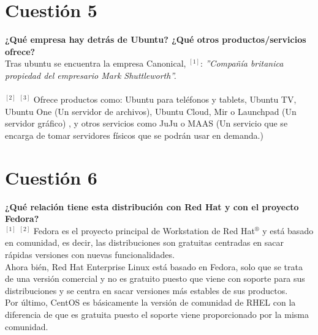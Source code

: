 \documentclass[a4paper, 11pt]{article} %
\begin{document}
\section{Cuestión 5}
\textbf{¿Qué empresa hay detrás de Ubuntu? ¿Qué otros productos/servicios ofrece?}\\ 
Tras ubuntu se encuentra la empresa Canonical, $^{[1]}$: \textit{''Compañía britanica propiedad del empresario Mark Shuttleworth''.} \\ \\$^{[2]}$ $^{[3]}$ Ofrece productos como: Ubuntu para teléfonos y tablets, Ubuntu TV, Ubuntu One (Un servidor de archivos), Ubuntu Cloud, Mir o Launchpad (Un servidor gráfico) , y otros servicios como JuJu o MAAS (Un servicio que se encarga de tomar servidores físicos que se podrán usar
en demanda.)\\


\section{Cuestión 6}
\textbf{¿Qué relación tiene esta distribución con Red Hat y con el proyecto Fedora?}\\ 
$^{[1]}$ $^{[2]}$ Fedora es el proyecto principal de Workstation de Red Hat$^{\circledR}$ y está basado en comunidad, es decir, las distribuciones son gratuitas centradas en sacar rápidas versiones con nuevas funcionalidades. \\Ahora bién, Red Hat Enterprise Linux está basado en Fedora, solo que se trata de una versión comercial y no es gratuito puesto que viene con soporte para sus distribuciones y se centra en sacar versiones más estables de sus productos. \\Por último, CentOS es básicamente la versión de comunidad de RHEL con la diferencia de que es gratuita puesto el soporte viene proporcionado por la misma comunidad.

\pagebreak
\end{document}
